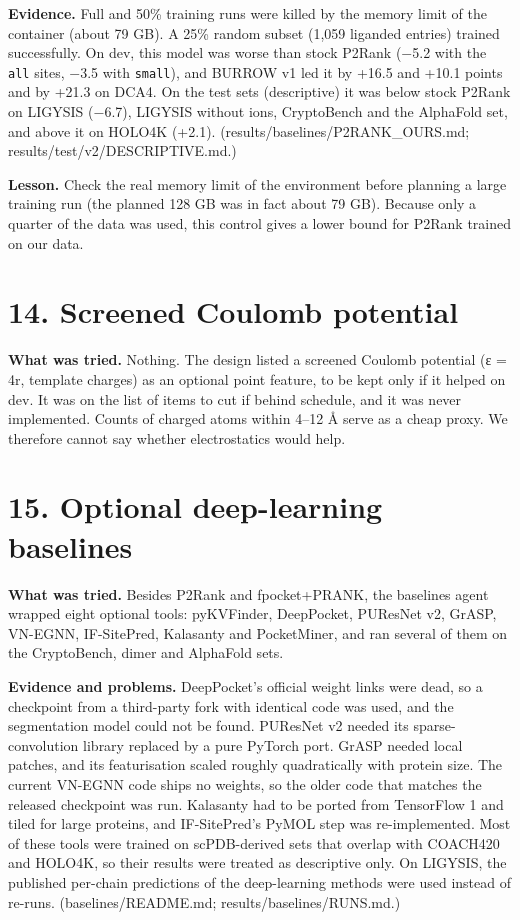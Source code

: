 \documentclass[10pt,letterpaper]{article}
\begin{document}
\textbf{Evidence.} Full and 50\% training runs were killed by the memory limit of the container (about 79 GB). A 25\% random subset (1,059 liganded entries) trained successfully. On dev, this model was worse than stock P2Rank ($-$5.2 with the \texttt{all} sites, $-$3.5 with \texttt{small}), and BURROW v1 led it by +16.5 and +10.1 points and by +21.3 on DCA4. On the test sets (descriptive) it was below stock P2Rank on LIGYSIS ($-$6.7), LIGYSIS without ions, CryptoBench and the AlphaFold set, and above it on HOLO4K (+2.1). (results/baselines/P2RANK\_OURS.md; results/test/v2/DESCRIPTIVE.md.)

\textbf{Lesson.} Check the real memory limit of the environment before planning a large training run (the planned 128 GB was in fact about 79 GB). Because only a quarter of the data was used, this control gives a lower bound for P2Rank trained on our data.

\section*{14. Screened Coulomb potential}

\textbf{What was tried.} Nothing. The design listed a screened Coulomb potential (ε = 4r, template charges) as an optional point feature, to be kept only if it helped on dev. It was on the list of items to cut if behind schedule, and it was never implemented. Counts of charged atoms within 4--12 \AA{} serve as a cheap proxy. We therefore cannot say whether electrostatics would help.

\section*{15. Optional deep-learning baselines}

\textbf{What was tried.} Besides P2Rank and fpocket+PRANK, the baselines agent wrapped eight optional tools: pyKVFinder, DeepPocket, PUResNet v2, GrASP, VN-EGNN, IF-SitePred, Kalasanty and PocketMiner, and ran several of them on the CryptoBench, dimer and AlphaFold sets.

\textbf{Evidence and problems.} DeepPocket's official weight links were dead, so a checkpoint from a third-party fork with identical code was used, and the segmentation model could not be found. PUResNet v2 needed its sparse-convolution library replaced by a pure PyTorch port. GrASP needed local patches, and its featurisation scaled roughly quadratically with protein size. The current VN-EGNN code ships no weights, so the older code that matches the released checkpoint was run. Kalasanty had to be ported from TensorFlow 1 and tiled for large proteins, and IF-SitePred's PyMOL step was re-implemented. Most of these tools were trained on scPDB-derived sets that overlap with COACH420 and HOLO4K, so their results were treated as descriptive only. On LIGYSIS, the published per-chain predictions of the deep-learning methods were used instead of re-runs. (baselines/README.md; results/baselines/RUNS.md.)
\end{document}
